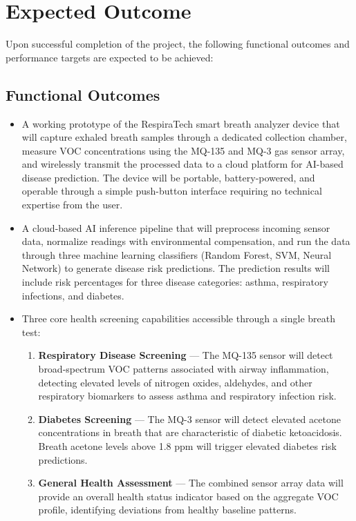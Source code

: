 \chapter{Expected Outcome}

Upon successful completion of the project, the following functional outcomes and performance targets are expected to be achieved:

\section{Functional Outcomes}
\begin{itemize}[leftmargin=1.5cm]
\item A working prototype of the RespiraTech smart breath analyzer device that will capture exhaled breath samples through a dedicated collection chamber, measure VOC concentrations using the MQ-135 and MQ-3 gas sensor array, and wirelessly transmit the processed data to a cloud platform for AI-based disease prediction. The device will be portable, battery-powered, and operable through a simple push-button interface requiring no technical expertise from the user.

\item A cloud-based AI inference pipeline that will preprocess incoming sensor data, normalize readings with environmental compensation, and run the data through three machine learning classifiers (Random Forest, SVM, Neural Network) to generate disease risk predictions. The prediction results will include risk percentages for three disease categories: asthma, respiratory infections, and diabetes.

\item Three core health screening capabilities accessible through a single breath test:
\begin{enumerate}
\item \textbf{Respiratory Disease Screening} --- The MQ-135 sensor will detect broad-spectrum VOC patterns associated with airway inflammation, detecting elevated levels of nitrogen oxides, aldehydes, and other respiratory biomarkers to assess asthma and respiratory infection risk.
\item \textbf{Diabetes Screening} --- The MQ-3 sensor will detect elevated acetone concentrations in breath that are characteristic of diabetic ketoacidosis. Breath acetone levels above 1.8 ppm will trigger elevated diabetes risk predictions.
\item \textbf{General Health Assessment} --- The combined sensor array data will provide an overall health status indicator based on the aggregate VOC profile, identifying deviations from healthy baseline patterns.
\end{enumerate}


\end{itemize}
